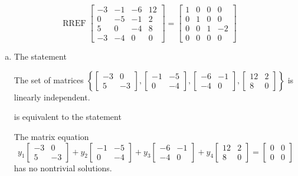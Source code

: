 \begin{exerciseAnswer} 


\[\operatorname{RREF} \left[\begin{array}{cccc}
-3 & -1 & -6 & 12 \\
0 & -5 & -1 & 2 \\
5 & 0 & -4 & 8 \\
-3 & -4 & 0 & 0
\end{array}\right] = \left[\begin{array}{cccc}
1 & 0 & 0 & 0 \\
0 & 1 & 0 & 0 \\
0 & 0 & 1 & -2 \\
0 & 0 & 0 & 0
\end{array}\right] \]


\begin{enumerate}[(a)]
\item The statement 
\begin{center}\begin{minipage}{0.8\textwidth}
 The set of matrices \( \left\{ \left[\begin{array}{cc}
-3 & 0 \\
5 & -3
\end{array}\right] , \left[\begin{array}{cc}
-1 & -5 \\
0 & -4
\end{array}\right] , \left[\begin{array}{cc}
-6 & -1 \\
-4 & 0
\end{array}\right] , \left[\begin{array}{cc}
12 & 2 \\
8 & 0
\end{array}\right] \right\} \) is linearly independent.
\end{minipage}\end{center}
     is equivalent to the statement 
\begin{center}\begin{minipage}{0.8\textwidth}
 The matrix equation \[ y_{1} \left[\begin{array}{cc}
-3 & 0 \\
5 & -3
\end{array}\right] + y_{2} \left[\begin{array}{cc}
-1 & -5 \\
0 & -4
\end{array}\right] + y_{3} \left[\begin{array}{cc}
-6 & -1 \\
-4 & 0
\end{array}\right] + y_{4} \left[\begin{array}{cc}
12 & 2 \\
8 & 0
\end{array}\right] = \left[\begin{array}{cc}
0 & 0 \\
0 & 0
\end{array}\right] \] has no nontrivial solutions. 
\end{minipage}\end{center}
    

\end{enumerate}
\end{exerciseAnswer}
